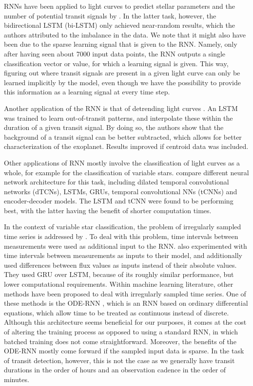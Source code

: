 RNNs have been applied to light curves to predict stellar parameters and the number of potential transit signals by \cite{hinners2018machine}. In the latter task, however, the bidirectional LSTM (bi-LSTM) only achieved near-random results, which the authors attributed to the imbalance in the data. We note that it might also have been due to the sparse learning signal that is given to the RNN. Namely, only after having seen about 7000 input data points, the RNN outputs a single classification vector or value, for which a learning signal is given. This way, figuring out where transit signals are present in a given light curve can only be learned implicitly by the model, even though we have the possibility to provide this information as a learning signal at every time step.

Another application of the RNN is that of detrending light curves \citep{morvan2020detrending}. An LSTM was trained to learn out-of-transit patterns, and interpolate these within the duration of a given transit signal. By doing so, the authors show that the background of a transit signal can be better subtracted, which allows for better characterization of the exoplanet. Results improved if centroid data was included.

Other applications of RNN mostly involve the classification of light curves as a whole, for example for the classification of variable stars. \cite{jamal2020neural} compare different neural network architecture for this task, including dilated temporal convolutional networks (dTCNs), LSTMs, GRUs, temporal convolutional NNs (tCNNs) and encoder-decoder models. The LSTM and tCNN were found to be performing best, with the latter having the benefit of shorter computation times. 

In the context of variable star classification, the problem of irregularly sampled time series is addressed by \cite{naul2018recurrent}. To deal with this problem, time intervals between measurements were used as additional input to the RNN. \cite{becker2020scalable} also experimented with time intervals between measurements as inputs to their model, and additionally used differences between flux values as inputs instead of their absolute values. They used GRU over LSTM, because of its roughly similar performance, but lower computational requirements. Within machine learning literature, other methods have been proposed to deal with irregularly sampled time series. One of these methods is the ODE-RNN \citep{rubanova2019latent, chen2018neural}, which is an RNN based on ordinary differential equations, which allow time to be treated as continuous instead of discrete. Although this architecture seems beneficial for our purposes, it comes at the cost of altering the training process as opposed to using a standard RNN, in which batched training does not come straightforward. Moreover, the benefits of the ODE-RNN mostly come forward if the sampled input data is sparse. In the task of transit detection, however, this is not the case as we generally have transit durations in the order of hours and an observation cadence in the order of minutes.

